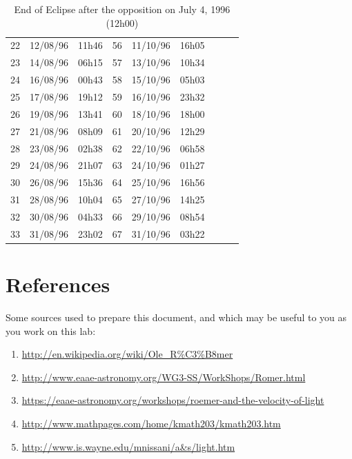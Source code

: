 \documentclass{tufte-handout}
\begin{document}
\begin{table}
\begin{tabular}{lll|lll|lll}
22 & 12/08/96 & 11h46 & 56 & 11/10/96 & 16h05 & & &\\
23 & 14/08/96 & 06h15 & 57 & 13/10/96 & 10h34 & & &\\
24 & 16/08/96 & 00h43 & 58 & 15/10/96 & 05h03 & & &\\
25 & 17/08/96 & 19h12 & 59 & 16/10/96 & 23h32 & & &\\
26 & 19/08/96 & 13h41 & 60 & 18/10/96 & 18h00 & & &\\
27 & 21/08/96 & 08h09 & 61 & 20/10/96 & 12h29 & & &\\
28 & 23/08/96 & 02h38 & 62 & 22/10/96 & 06h58 & & &\\
29 & 24/08/96 & 21h07 & 63 & 24/10/96 & 01h27 & & &\\
30 & 26/08/96 & 15h36 & 64 & 25/10/96 & 16h56 & & &\\
31 & 28/08/96 & 10h04 & 65 & 27/10/96 & 14h25 & & &\\
32 & 30/08/96 & 04h33 & 66 & 29/10/96 & 08h54 & & &\\
33 & 31/08/96 & 23h02 & 67 & 31/10/96 & 03h22 & & &\\
\end{tabular}
\caption{End of Eclipse after the opposition on July 4, 1996 (12h00)}
\end{table}

\section{References}

Some sources used to prepare this document, and which may be useful to you as you work on this lab:

\begin{enumerate}
\item \url{http://en.wikipedia.org/wiki/Ole_R%C3%B8mer}
\item \url{http://www.eaae-astronomy.org/WG3-SS/WorkShops/Romer.html}
\item \url{https://eaae-astronomy.org/workshops/roemer-and-the-velocity-of-light}
\item \url{http://www.mathpages.com/home/kmath203/kmath203.htm}
\item \url{http://www.is.wayne.edu/mnissani/a&s/light.htm}
\end{enumerate}
\end{document}
